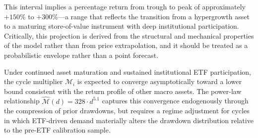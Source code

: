 This interval implies a percentage return from trough to peak of approximately
$+150\%$ to $+300\%$---a range that reflects the transition from a
hypergrowth asset to a maturing store-of-value instrument with deep
institutional participation. Critically, this projection is derived from the
structural and mechanical properties of the model rather than from price
extrapolation, and it should be treated as a probabilistic envelope rather
than a point forecast.

\begin{proposition}
  Under continued asset maturation and sustained institutional ETF
  participation, the cycle multiplier $\mathcal{M}_i$ is expected to converge
  asymptotically toward a lower bound consistent with the return profile of
  other macro assets. The power-law relationship
  $\hat{\mathcal{M}}(d) = 328 \cdot d^{5.1}$ captures this convergence
  endogenously through the compression of prior drawdowns, but requires a
  regime adjustment for cycles in which ETF-driven demand materially
  alters the drawdown distribution relative to the pre-ETF calibration sample.
\end{proposition}

